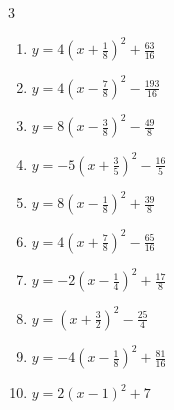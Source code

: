 \begin{multicols}{3}
\begin{enumerate}
  \item $\displaystyle y=4\left( x+\frac{1}{8}\right)^{2}+\frac{63}{16}$


  \item $\displaystyle y=4\left( x-\frac{7}{8}\right)^{2}-\frac{193}{16}$


  \item $\displaystyle y=8\left( x-\frac{3}{8}\right)^{2}-\frac{49}{8}$


  \item $\displaystyle y=-5\left( x+\frac{3}{5}\right)^{2}-\frac{16}{5}$


  \item $\displaystyle y=8\left( x-\frac{1}{8}\right)^{2}+\frac{39}{8}$


\columnbreak %

  \item $\displaystyle y=4\left( x+\frac{7}{8}\right)^{2}-\frac{65}{16}$


  \item $\displaystyle y=-2\left( x-\frac{1}{4}\right)^{2}+\frac{17}{8}$


  \item $\displaystyle y=\left( x+\frac{3}{2}\right)^{2}-\frac{25}{4}$


  \item $\displaystyle y=-4\left( x-\frac{1}{8}\right)^{2}+\frac{81}{16}$


  \item $\displaystyle y=2\left( x-1\right)^{2}+7$


\end{enumerate}
\end{multicols}

